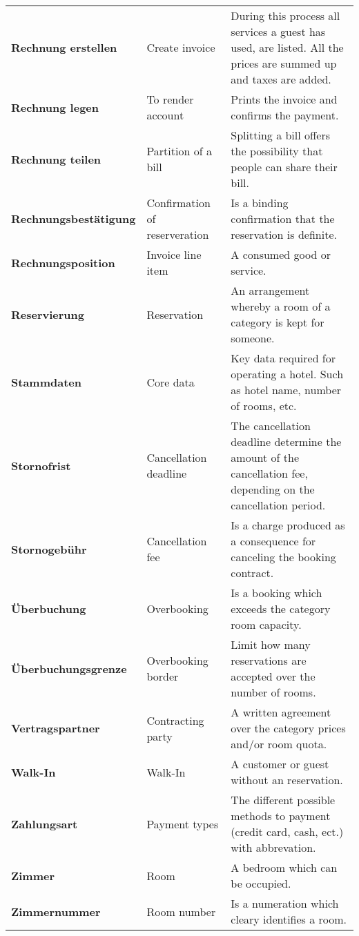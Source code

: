\documentclass[../Pflichtenheft.tex]{subfiles}
\begin{document}
\begin{longtable}{p{4cm} p{4cm} p{6cm}}
        \textbf{Rechnung erstellen} & {Create invoice} & During this process all services a guest has used, are listed. All the prices are summed up and taxes are added. \\[0.5cm]
        \textbf{Rechnung legen} & {To render account} & Prints the invoice and confirms the payment. \\[0.5cm]
        \textbf{Rechnung teilen} & {Partition of a bill} & Splitting a bill offers the possibility that people can share their bill. \\[0.5cm]
        \textbf{Rechnungsbestätigung} & {Confirmation of reserveration} & Is a binding confirmation that the reservation is definite. \\[0.5cm]
        \textbf{Rechnungsposition} & {Invoice line item} & A consumed good or service. \\[0.5cm]
        \textbf{Reservierung} & {Reservation} & An arrangement whereby a room of a category is kept for someone. \\[0.5cm]
        \textbf{Stammdaten} & {Core data} & Key data required for operating a hotel. Such as hotel name, number of rooms, etc. \\[0.5cm]
        \textbf{Stornofrist} & {Cancellation deadline} & The cancellation deadline determine the amount of the cancellation fee, depending on the cancellation period. \\[0.5cm]
		\textbf{Stornogebühr} & {Cancellation fee} & Is a charge produced as a consequence for canceling the booking contract. \\[0.5cm]
		\textbf{Überbuchung} & {Overbooking} & Is a booking which exceeds the category room capacity. \\[0.5cm]
        \textbf{Überbuchungsgrenze} & {Overbooking border} & Limit how many reservations are accepted over the number of rooms. \\[0.5cm]
        \textbf{Vertragspartner} & {Contracting party} & A written agreement over the category prices and/or room quota. \\[0.5cm]
        \textbf{Walk-In} & {Walk-In} & A customer or guest without an reservation. \\[0.5cm]
        \textbf{Zahlungsart} & {Payment types} & The different possible methods to payment (credit card, cash, ect.) with abbrevation. \\[0.5cm]
		\textbf{Zimmer} & {Room} & A bedroom which can be occupied. \\[0.5cm]
		\textbf{Zimmernummer} & {Room number} & Is a numeration which cleary identifies a room. \\[0.5cm]

\end{longtable}
\end{document}
